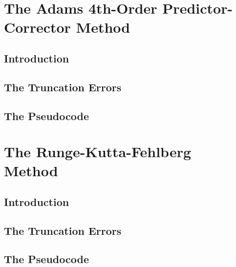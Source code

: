 \documentclass[12pt,oneside]{book}
\begin{document}
	\section{The Adams 4th-Order Predictor-Corrector Method} \label{m:ab4pc}
		\begin{spacing}{1.2}
			
			\subsection{Introduction}
			
			
			\subsection{The Truncation Errors}
			
			
			\subsection{The Pseudocode}
			
		\end{spacing}
		
		\clearpage
	\section{The Runge-Kutta-Fehlberg Method} \label{m:rkf}
		\begin{spacing}{1.2}
			
			\subsection{Introduction}
			
			
			\subsection{The Truncation Errors}
			
			
			\subsection{The Pseudocode}
			
		\end{spacing}
		
		\clearpage
\end{document}
